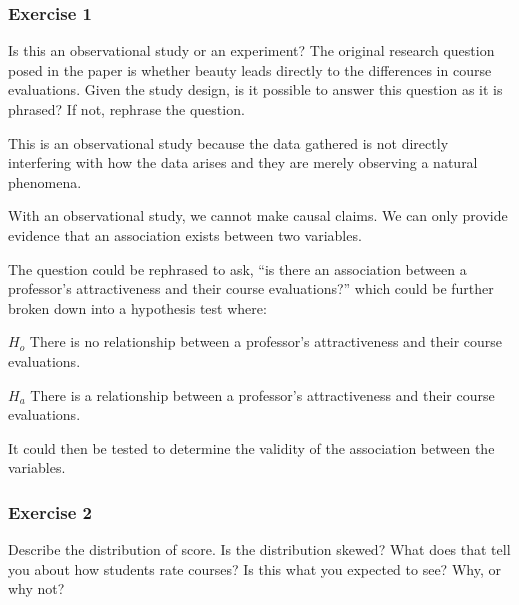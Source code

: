\documentclass[
]{article}
\newenvironment{Shaded}{\begin{snugshade}}{\end{snugshade}}
\newcommand{\DataTypeTok}[1]{\textcolor[rgb]{0.13,0.29,0.53}{#1}}
\newcommand{\KeywordTok}[1]{\textcolor[rgb]{0.13,0.29,0.53}{\textbf{#1}}}
\newcommand{\NormalTok}[1]{#1}
\newcommand{\OperatorTok}[1]{\textcolor[rgb]{0.81,0.36,0.00}{\textbf{#1}}}
\newcommand{\StringTok}[1]{\textcolor[rgb]{0.31,0.60,0.02}{#1}}
\begin{document}
\hypertarget{exercise-1}{%
\subsubsection{Exercise 1}\label{exercise-1}}

Is this an observational study or an experiment? The original research
question posed in the paper is whether beauty leads directly to the
differences in course evaluations. Given the study design, is it
possible to answer this question as it is phrased? If not, rephrase the
question.

This is an observational study because the data gathered is not directly
interfering with how the data arises and they are merely observing a
natural phenomena.

With an observational study, we cannot make causal claims. We can only
provide evidence that an association exists between two variables.

The question could be rephrased to ask, ``is there an association
between a professor's attractiveness and their course evaluations?''
which could be further broken down into a hypothesis test where:

\(H_o\) There is no relationship between a professor's attractiveness
and their course evaluations.

\(H_a\) There is a relationship between a professor's attractiveness and
their course evaluations.

It could then be tested to determine the validity of the association
between the variables.

\hypertarget{exercise-2}{%
\subsubsection{Exercise 2}\label{exercise-2}}

Describe the distribution of score. Is the distribution skewed? What
does that tell you about how students rate courses? Is this what you
expected to see? Why, or why not?

\begin{Shaded}
\end{Shaded}
\end{document}

